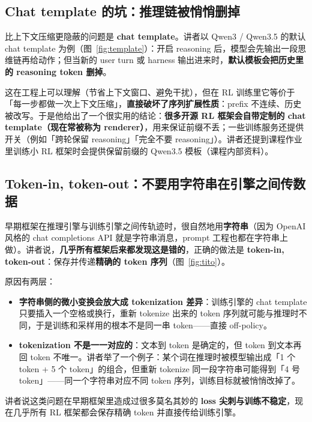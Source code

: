 \documentclass[a4paper]{article}
\begin{document}
\subsection{Chat template 的坑：推理链被悄悄删掉}

比上下文压缩更隐蔽的问题是 \textbf{chat template}。讲者以 Qwen3 / Qwen3.5 的默认 chat template 为例（图~\ref{fig:template}）：开启 reasoning 后，模型会先输出一段思维链再给动作；但当新的 user turn 或 harness 输出进来时，\textbf{默认模板会把历史里的 reasoning token 删掉}。

这在工程上可以理解（节省上下文窗口、避免干扰），但在 RL 训练里它等价于「每一步都做一次上下文压缩」，\textbf{直接破坏了序列扩展性质}：prefix 不连续、历史被改写。于是他给出了一个很实用的结论：\textbf{很多开源 RL 框架会自带定制的 chat template（现在常被称为 renderer）}，用来保证前缀不丢；一些训练服务还提供开关（例如「跨轮保留 reasoning」「完全不要 reasoning」）。讲者还提到课程作业里训练小 RL 框架时会提供保留前缀的 Qwen3.5 模板（课程内部资料）。

\subsection{Token-in, token-out：不要用字符串在引擎之间传数据}

早期框架在推理引擎与训练引擎之间传轨迹时，很自然地用\textbf{字符串}（因为 OpenAI 风格的 chat completions API 就是字符串消息，prompt 工程也都在字符串上做）。讲者说，\textbf{几乎所有框架后来都发现这是错的}，正确的做法是 \textbf{token-in, token-out}：保存并传递\textbf{精确的 token 序列}（图~\ref{fig:tito}）。

原因有两层：

\begin{itemize}
\item \textbf{字符串侧的微小变换会放大成 tokenization 差异}：训练引擎的 chat template 只要插入一个空格或换行，重新 tokenize 出来的 token 序列就可能与推理时不同，于是训练和采样用的根本不是同一串 token——直接 off-policy。
\item \textbf{tokenization 不是一一对应的}：文本到 token 是确定的，但 token 到文本再回 token 不唯一。讲者举了一个例子：某个词在推理时被模型输出成「1 个 token + 5 个 token」的组合，但重新 tokenize 同一段字符串可能得到「4 号 token」——同一个字符串对应不同 token 序列，训练目标就被悄悄改掉了。
\end{itemize}

讲者说这类问题在早期框架里造成过很多莫名其妙的 \textbf{loss 尖刺与训练不稳定}，现在几乎所有 RL 框架都会保存精确 token 并直接传给训练引擎。
\end{document}
